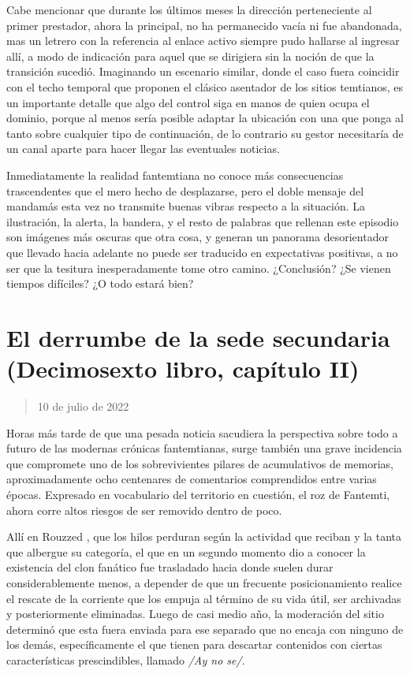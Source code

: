 \documentclass[
]{book}
\begin{document}
Cabe mencionar que durante los últimos meses la dirección perteneciente al primer prestador, ahora la principal, no ha permanecido vacía ni fue abandonada, mas un letrero con la referencia al enlace activo siempre pudo hallarse al ingresar allí, a modo de indicación para aquel que se dirigiera sin la noción de que la transición sucedió. Imaginando un escenario similar, donde el caso fuera coincidir con el techo temporal que proponen el clásico asentador de los sitios temtianos, es un importante detalle que algo del control siga en manos de quien ocupa el dominio, porque al menos sería posible adaptar la ubicación con una que ponga al tanto sobre cualquier tipo de continuación, de lo contrario su gestor necesitaría de un canal aparte para hacer llegar las eventuales noticias.

Inmediatamente la realidad fantemtiana no conoce más consecuencias trascendentes que el mero hecho de desplazarse, pero el doble mensaje del mandamás esta vez no transmite buenas vibras respecto a la situación. La ilustración, la alerta, la bandera, y el resto de palabras que rellenan este episodio son imágenes más oscuras que otra cosa, y generan un panorama desorientador que llevado hacia adelante no puede ser traducido en expectativas positivas, a no ser que la tesitura inesperadamente tome otro camino. ¿Conclusión? ¿Se vienen tiempos difíciles? ¿O todo estará bien?

\hypertarget{el-derrumbe-de-la-sede-secundaria-decimosexto-libro-capuxedtulo-ii}{%
\section{El derrumbe de la sede secundaria (Decimosexto libro, capítulo II)}\label{el-derrumbe-de-la-sede-secundaria-decimosexto-libro-capuxedtulo-ii}}

\begin{quote}
10 de julio de 2022
\end{quote}

Horas más tarde de que una pesada noticia sacudiera la perspectiva sobre todo a futuro de las modernas crónicas fantemtianas, surge también una grave incidencia que compromete uno de los sobrevivientes pilares de acumulativos de memorias, aproximadamente ocho centenares de comentarios comprendidos entre varias épocas. Expresado en vocabulario del territorio en cuestión, el roz de Fantemti, ahora corre altos riesgos de ser removido dentro de poco.

Allí en Rouzzed , que los hilos perduran según la actividad que reciban y la tanta que albergue su categoría, el que en un segundo momento dio a conocer la existencia del clon fanático fue trasladado hacia donde suelen durar considerablemente menos, a depender de que un frecuente posicionamiento realice el rescate de la corriente que los empuja al término de su vida útil, ser archivadas y posteriormente eliminadas. Luego de casi medio año, la moderación del sitio determinó que esta fuera enviada para ese separado que no encaja con ninguno de los demás, específicamente el que tienen para descartar contenidos con ciertas características prescindibles, llamado \emph{/Ay no se/}.
\end{document}
